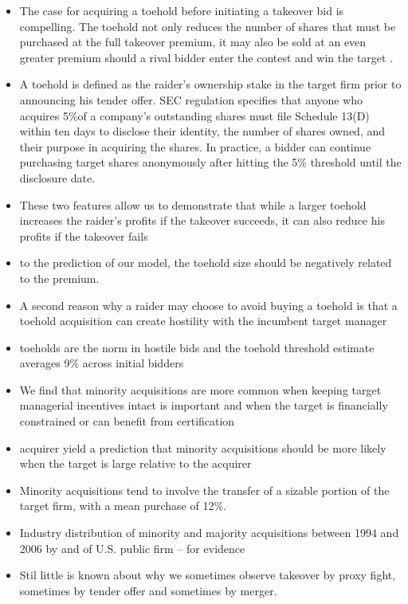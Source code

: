 \documentclass[12pt]{article}
\begin{document}
\begin{itemize}
        \item The case for acquiring a toehold before initiating a takeover bid is compelling. The toehold not only reduces the number of
        shares that must be purchased at the full takeover premium, it may also be sold at an even greater premium should a rival bidder enter the contest and win the target . \citep{Eckbo2009}

        \item A toehold is defined as the raider’s ownership stake in the target firm prior to announcing his tender offer. SEC regulation specifies that anyone who acquires 5\%of a company’s outstanding shares must file Schedule 13(D) within ten days to disclose their identity, the number of shares owned, and their purpose in acquiring the shares. In practice, a bidder can continue purchasing target shares anonymously after hitting the 5\% threshold until the disclosure date. \citep{Goldman2005}

        \item These two features allow us to demonstrate that while a larger toehold increases the raider’s profits if the takeover succeeds, it can also reduce his profits if the takeover fails \citep{Goldman2005}

        \item to the prediction of our model, the toehold size should be negatively related to the premium. \citep{Goldman2005}

        \item A second reason why a raider may choose to avoid buying a toehold is that a toehold acquisition can create hostility with the incumbent target manager \citep{Goldman2005}

        \item toeholds are the norm in hostile bids and the toehold threshold estimate averages 9\% across initial bidders \citep{Betton2009}
 
        \item We find that minority acquisitions are more common when keeping target managerial incentives intact is important and when the target is financially constrained or can benefit from certification \citep{Ouimet2013}

        \item acquirer yield a prediction that minority acquisitions should be more likely when the target is large relative to the acquirer \citep{Ouimet2013}

        \item Minority acquisitions tend to involve the transfer of a sizable portion of the target firm, with a mean purchase of 12\%. \citep{Ouimet2013}

        \item Industry distribution of minority and majority acquisitions between 1994 and 2006 by and of U.S. public firm \citep{Ouimet2013} -- for evidence

        \item Stil little is known about why we sometimes observe takeover by proxy fight, sometimes by tender offer and sometimes by merger. \citep{Harris1988}
    \end{itemize}
\end{document}
